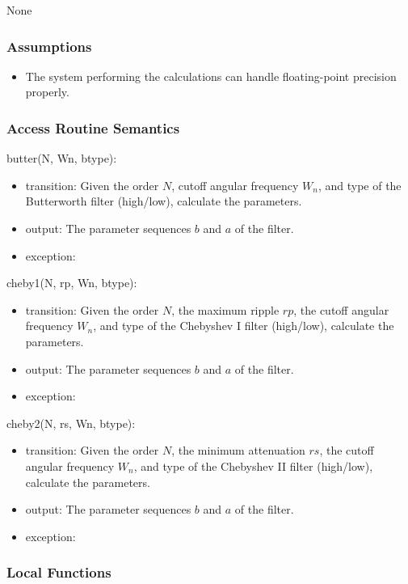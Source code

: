 \documentclass[12pt, titlepage]{article}
\begin{document}
None

\subsubsection{Assumptions}

\begin{itemize}
\item The system performing the calculations can handle floating-point precision
properly.
\end{itemize}

\subsubsection{Access Routine Semantics}

\noindent butter(N, Wn, btype):
\begin{itemize}
\item transition: Given the order $N$, cutoff angular frequency $W_n$, and type
of the Butterworth filter (high/low), calculate the parameters.
\item output: The parameter sequences $b$ and $a$ of the filter.
\item exception: 
\end{itemize}

\noindent cheby1(N, rp, Wn, btype):
\begin{itemize}
\item transition: Given the order $N$, the maximum ripple $rp$, the cutoff
angular frequency $W_n$, and type of the Chebyshev I filter (high/low),
calculate the parameters.
\item output: The parameter sequences $b$ and $a$ of the filter.
\item exception: 
\end{itemize}

\noindent cheby2(N, rs, Wn, btype):
\begin{itemize}
\item transition: Given the order $N$, the minimum attenuation $rs$, the cutoff
angular frequency $W_n$, and type of the Chebyshev II filter (high/low),
calculate the parameters.
\item output: The parameter sequences $b$ and $a$ of the filter.
\item exception: 
\end{itemize}

\subsubsection{Local Functions}
\end{document}
